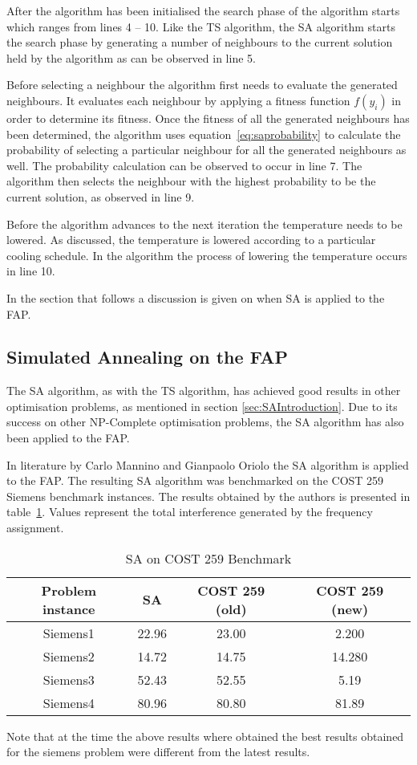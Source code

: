 After the algorithm has been initialised the search phase of the algorithm starts which ranges from lines 4 -- 10. Like the \gls{TS} algorithm, the \gls{SA} algorithm starts the search phase by generating a number of neighbours to the current solution held by the algorithm as can be observed in line 5.

Before selecting a neighbour the algorithm first needs to evaluate the generated neighbours. It evaluates each neighbour by applying a fitness function $f(y_i)$ in order to determine its fitness.
Once the fitness of all the generated neighbours has been determined, the algorithm uses equation~\ref{eq:saprobability} to calculate the probability of selecting a particular neighbour for all the generated neighbours as well. The probability calculation can be observed to occur in line 7. The algorithm then selects the neighbour with the highest probability to be the current solution, as observed in line 9. 

Before the algorithm advances to the next iteration the temperature needs to be lowered. As discussed, the temperature is lowered according to a particular cooling schedule. In the algorithm the process of lowering the temperature occurs in line 10.

In the section that follows a discussion is given on when \gls{SA} is applied to the \gls{FAP}.
\subsection{Simulated Annealing on the \gls{FAP}}
The \gls{SA} algorithm, as with the \gls{TS} algorithm, has achieved good results in other optimisation problems, as mentioned in section \ref{sec:SAIntroduction}. Due to its success on other NP-Complete optimisation problems, the \gls{SA} algorithm has also been applied to the \gls{FAP}.

In literature by Carlo Mannino and Gianpaolo Oriolo\cite{SolvingSuperIntervalGraphs} the \gls{SA} algorithm is applied to the \gls{FAP}. The resulting \gls{SA} algorithm was benchmarked on the \gls{COST} 259 Siemens benchmark instances. The results obtained by the authors is presented in table~\ref{tab:SA}. Values represent the total interference generated by the frequency assignment. 
\begin{table}[H]
\centering
	\begin{tabular}{| c | c | c | c |}
	\hline
	Problem instance & \gls{SA} & \gls{COST} 259 (old) & \gls{COST} 259 (new) \\ \hline
	Siemens1 & 22.96 & 23.00 & 2.200\\ \hline
	Siemens2 & 14.72 & 14.75 & 14.280\\ \hline
	Siemens3 & 52.43 & 52.55 & 5.19\\ \hline
	Siemens4 & 80.96 & 80.80 & 81.89\\ \hline
	\end{tabular}
\caption{SA on \gls{COST} 259 Benchmark}
\label{tab:SA}
\end{table}
Note that at the time the above results where obtained the best results obtained for the siemens problem were different from the latest results.


